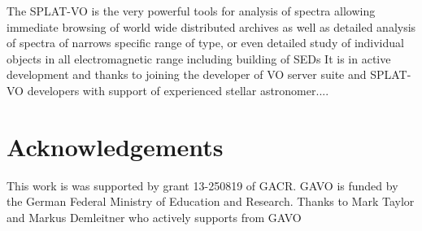 \documentclass[final,authoryear,5p,times,twocolumn]{elsarticle}
\begin{document}
The SPLAT-VO is the very powerful tools for analysis of spectra allowing immediate browsing of world wide distributed archives as well as detailed analysis of spectra of narrows specific range of type, or even detailed study of individual objects in all electromagnetic range including building of SEDs
It is in active development and thanks to joining the developer of VO server suite and SPLAT-VO developers with support of experienced stellar astronomer....





\section{Acknowledgements}
This work is was supported by grant 13-250819 of GACR. GAVO is funded by the German Federal Ministry of Education and Research.
Thanks to Mark Taylor and Markus Demleitner who actively supports from
GAVO



\end{document}
